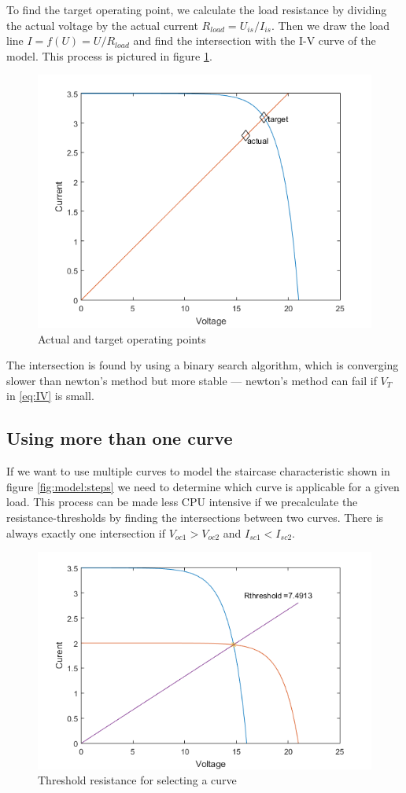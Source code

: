 To find the target operating point, we calculate the load resistance by dividing
the actual voltage by the actual current $R_{load} = U_{is}  /  I_{is}$. Then we
draw the load line $I = f(U) =  U / R_{load}$ and find the intersection with the
I-V   curve   of   the   model.   This   process   is   pictured    in    figure
\ref{fig:model:approx}.
\begin{figure}[h]
	\center
    \includegraphics[width=.75\textwidth]{images/model/approx.png}
    \caption{Actual and target operating points}
    \label{fig:model:approx}
\end{figure}
The  intersection  is found  by  using  a  binary  search  algorithm,  which  is
converging slower than newton's method but more  stable  --- newton's method can
fail if $V_T$ in \eqref{eq:IV} is small.


\subsection{Using more than one curve}

If we want to use multiple curves to model the staircase characteristic shown in
figure \ref{fig:model:steps} we  need to determine which curve is applicable for
a given load. This process can be made less CPU intensive if we precalculate the
resistance-thresholds by finding the intersections between two curves.  There is
always exactly one intersection if  $V_{oc1} > V_{oc2}$ and $I_{sc1} < I_{sc2}$.
\begin{figure}[h]
	\center
    \includegraphics[width=.75\textwidth]{images/model/threshold.png}
    \caption{Threshold resistance for selecting a curve}
    \label{fig:model:threshold}
\end{figure}

